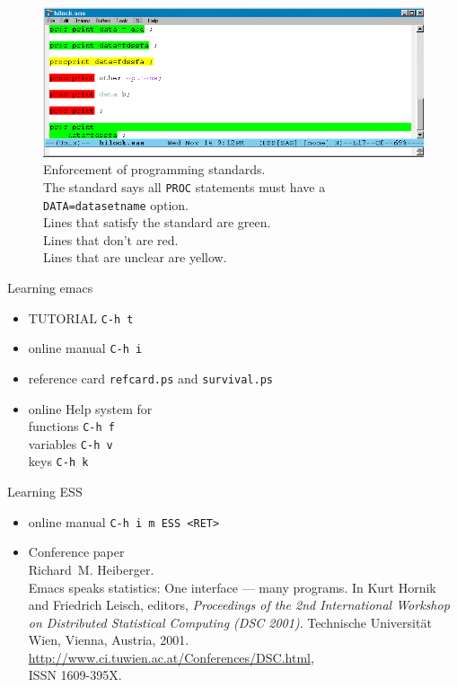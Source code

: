 \begin{figure}[tbp]
  \includegraphics[angle=0,width=9.4in,natwidth=842,natheight=331]{Image10.png}
  \caption[]{Enforcement of programming standards.\\
  The standard says all {\tt PROC} statements
must have a {\tt DATA=datasetname} option.\\
Lines that satisfy the standard are green.\\
Lines that don't are red.\\
Lines that are unclear are yellow.}
  \label{Image10}
\end{figure}

\newpage
Learning emacs
\begin{itemize}
\setlength{\itemsep}{1ex}
\item TUTORIAL {\tt C-h t}
\item online manual {\tt C-h i}
\item reference card {\tt refcard.ps} and {\tt survival.ps}
\item online Help system for\\
 functions {\tt C-h f}\\
 variables {\tt C-h v}\\
 keys {\tt C-h k}
\end{itemize}

\newpage
Learning ESS
\begin{itemize}
\setlength{\itemsep}{1ex}
\item online manual {\tt C-h i m ESS <RET>}
\item Conference paper\\
Richard~M. Heiberger.\\
\newblock Emacs speaks statistics: One interface --- many programs.
\newblock In Kurt Hornik and Friedrich Leisch, editors, {\em Proceedings of the
  2nd International Workshop on Distributed Statistical Computing (DSC 2001)}.
  Technische Universit{\"a}t Wien, Vienna, Austria, 2001.\\
\newblock \url{http://www.ci.tuwien.ac.at/Conferences/DSC.html},\\
ISSN 1609-395X.
\end{itemize}


